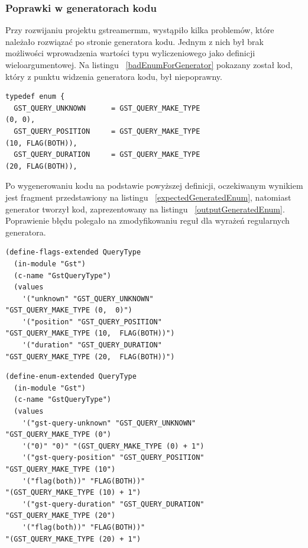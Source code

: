 \documentclass[12pt]{article}
\begin{document}
\subsubsection{Poprawki w generatorach kodu}
Przy rozwijaniu projektu gstreamermm, wystąpiło kilka problemów, które należało rozwiązać po stronie generatora kodu. Jednym z nich był brak możliwości wprowadzenia wartości typu wyliczeniowego jako definicji wieloargumentowej. Na listingu ~\ref{badEnumForGenerator} pokazany został kod, który z punktu widzenia generatora kodu, był niepoprawny.
    \begin{lstlisting}[caption=Przykładowy fragment niepoprawnego z punktu widzenia generatora kodu źródłowego, label=badEnumForGenerator]
typedef enum {
  GST_QUERY_UNKNOWN      = GST_QUERY_MAKE_TYPE
(0, 0),
  GST_QUERY_POSITION     = GST_QUERY_MAKE_TYPE 
(10, FLAG(BOTH)),
  GST_QUERY_DURATION     = GST_QUERY_MAKE_TYPE 
(20, FLAG(BOTH)),
    \end{lstlisting}

Po wygenerowaniu kodu na podstawie powyższej definicji, oczekiwanym wynikiem jest fragment przedstawiony na listingu ~\ref{expectedGeneratedEnum}, natomiast generator tworzył kod, zaprezentowany na listingu ~\ref{outputGeneratedEnum}. Poprawienie błędu polegało na zmodyfikowaniu reguł dla wyrażeń regularnych generatora.

    \begin{lstlisting}[caption=Oczekiwany wynik działania generatora kodu, label=expectedGeneratedEnum]
(define-flags-extended QueryType
  (in-module "Gst")
  (c-name "GstQueryType")
  (values
    '("unknown" "GST_QUERY_UNKNOWN" 
"GST_QUERY_MAKE_TYPE (0,  0)")
    '("position" "GST_QUERY_POSITION" 
"GST_QUERY_MAKE_TYPE (10,  FLAG(BOTH))")
    '("duration" "GST_QUERY_DURATION" 
"GST_QUERY_MAKE_TYPE (20,  FLAG(BOTH))")
    \end{lstlisting}

    \begin{lstlisting}[caption=Błędnie wygenerowany kod przez generator, label=outputGeneratedEnum]
(define-enum-extended QueryType
  (in-module "Gst")
  (c-name "GstQueryType")
  (values
    '("gst-query-unknown" "GST_QUERY_UNKNOWN" 
"GST_QUERY_MAKE_TYPE (0")
    '("0)" "0)" "(GST_QUERY_MAKE_TYPE (0) + 1")
    '("gst-query-position" "GST_QUERY_POSITION" 
"GST_QUERY_MAKE_TYPE (10")
    '("flag(both))" "FLAG(BOTH))" 
"(GST_QUERY_MAKE_TYPE (10) + 1")
    '("gst-query-duration" "GST_QUERY_DURATION" 
"GST_QUERY_MAKE_TYPE (20")
    '("flag(both))" "FLAG(BOTH))" 
"(GST_QUERY_MAKE_TYPE (20) + 1")
    \end{lstlisting}
\end{document}
